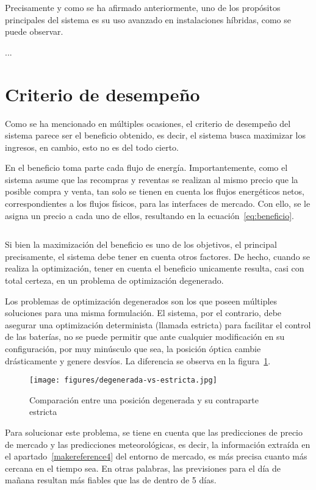 Precisamente y como se ha afirmado anteriormente, uno de los propósitos principales del sistema es su uso avanzado en instalaciones híbridas, como se puede observar.

...

\section{Criterio de desempeño}
\label{makereference5.4}

Como se ha mencionado en múltiples ocasiones, el criterio de desempeño del sistema parece ser el beneficio obtenido, es decir, el sistema busca maximizar los ingresos, en cambio, esto no es del todo cierto.

En el beneficio toma parte cada flujo de energía. Importantemente, como el sistema asume que las recompras y reventas se realizan al mismo precio que la posible compra y venta, tan solo se tienen en cuenta los flujos energéticos netos, correspondientes a los flujos físicos, para las interfaces de mercado. Con ello, se le asigna un precio a cada uno de ellos, resultando en la ecuación~\ref{eq:beneficio}.

\begin{equation}
  \label{eq:beneficio}
\end{equation}

Si bien la maximización del beneficio es uno de los objetivos, el principal precisamente, el sistema debe tener en cuenta otros factores. De hecho, cuando se realiza la optimización, tener en cuenta el beneficio unicamente resulta, casi con total certeza, en un problema de optimización degenerado.

Los problemas de optimización degenerados son los que poseen múltiples soluciones para una misma formulación. El sistema, por el contrario, debe asegurar una optimización determinista (llamada estricta) para facilitar el control de las baterías, no se puede permitir que ante cualquier modificación en su configuración, por muy minúsculo que sea, la posición óptica cambie drásticamente y genere desvíos. La diferencia se observa en la figura~\ref{fig:degenerada-vs-estricta}.

\begin{figure}
  \centering
  \texttt{[image: figures/degenerada-vs-estricta.jpg]}
  \caption{Comparación entre una posición degenerada y su contraparte estricta}
  \label{fig:degenerada-vs-estricta}
\end{figure}

Para solucionar este problema, se tiene en cuenta que las predicciones de precio de mercado y las predicciones meteorológicas, es decir, la información extraída en el apartado~\ref{makereference4} del entorno de mercado, es más precisa cuanto más cercana en el tiempo sea. En otras palabras, las previsiones para el día de mañana resultan más fiables que las de dentro de 5 días.

